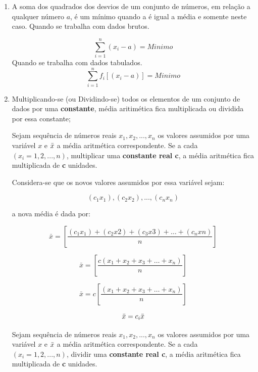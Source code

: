 \begin{enumerate}
\newpage

\item [{D)}] A soma dos quadrados dos desvios de um conjunto de números, em relação a qualquer número $a$, é um mínimo quando a é igual a média e somente neste caso.\vskip0.3cm
Quando se trabalha com dados brutos.

$$ \sum_{i=1}^{n}(x_{i}- a)= Minimo  $$
Quando se trabalha com dados tabulados.
$$ \sum_{i=1}^{n}f_{i}[(x_{i}- a)]= Minimo  $$

  \item [{E)}] Multiplicando-se (ou Dividindo-se) todos os elementos
de um conjunto de dados por uma \textbf{constante}, média aritimética fica multiplicada ou dividida por essa constante;

\vskip0.3cm
\textbf{} 
\vskip0.3cm

Sejam sequência de números reais $x_{1}, x_{2},...,x_{n}$ os valores assumidos por uma variável $x$ e $\Bar{x}$ a média aritmética correspondente. Se a cada $(x_{i}=1,2,...,n)$, multiplicar uma \textbf{constante real c}, a média aritmética fica multiplicada de \textbf{c} unidades.\vskip0.3cm


Considera-se que os novos valores assumidos por essa variável sejam: 

$$(c_{1}x_{1}),(c_{2}x_{2}),...,(c_{n}x_{n})$$

a nova média é dada por:

\begin{equation*}\label{media3}
     \bar{x} =  \left[ \frac{(c_{1}x_{1})+(c_{2}x{2})+(c_{3}x{3})+\ldots+(c_{n}x{n})}{n} \right]
\end{equation*}

\begin{equation*}\label{media3}
     \bar{x} = \left[ \frac{c(x_{1}+x_{2}+x_{3}+\ldots+x_{n})}{n} \right]
\end{equation*}

\begin{equation*}\label{media3}
     \bar{x}=c \left[\frac{(x_{1}+x_{2}+x_{3}+\ldots+x_{n})}{n} \right]
\end{equation*}


\begin{equation*}\label{media3}
     \bar{x}=c_{i}\Bar{x} 
\end{equation*}



\vskip0.3cm
\textbf{} 
\vskip0.3cm

Sejam sequência de números reais $x_{1}, x_{2},...,x_{n}$ os valores assumidos por uma variável $x$ e $\Bar{x}$ a média aritmética correspondente. Se a cada $(x_{i}=1,2,...,n)$, dividir uma \textbf{constante real c}, a média aritmética fica multiplicada de \textbf{c} unidades.\vskip0.3cm



\end{enumerate}
